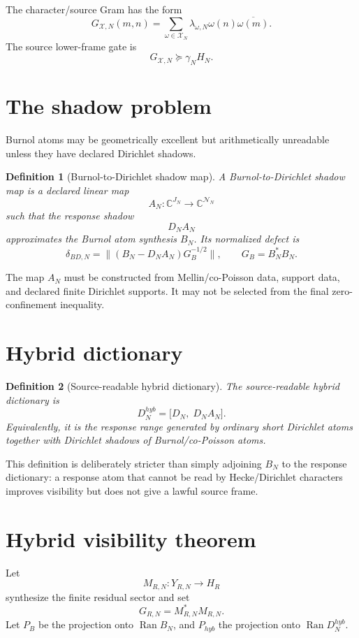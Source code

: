 \documentclass[11pt]{article}
\newtheorem{definition}{Definition}
\begin{document}
The character/source Gram has the form
\[
G_{\mathcal X,N}(m,n)
=
\sum_{\omega\in\mathcal X_N}
\lambda_{\omega,N}\omega(n)\overline{\omega(m)}.
\]
The source lower-frame gate is
\[
G_{\mathcal X,N}\succeq\gamma_NH_N.
\]

\section{The shadow problem}

Burnol atoms may be geometrically excellent but arithmetically unreadable unless they have
declared Dirichlet shadows.

\begin{definition}[Burnol-to-Dirichlet shadow map]
A Burnol-to-Dirichlet shadow map is a declared linear map
\[
A_N:\mathbb C^{J_N}\to\mathbb C^{\mathcal N_N}
\]
such that the response shadow
\[
D_NA_N
\]
approximates the Burnol atom synthesis \(B_N\).  Its normalized defect is
\[
\delta_{BD,N}
=
\|(B_N-D_NA_N)G_B^{-1/2}\|,
\qquad
G_B=B_N^*B_N.
\]
\end{definition}

The map \(A_N\) must be constructed from Mellin/co-Poisson data, support data, and declared
finite Dirichlet supports.  It may not be selected from the final zero-confinement inequality.

\section{Hybrid dictionary}

\begin{definition}[Source-readable hybrid dictionary]
The source-readable hybrid dictionary is
\[
D_N^{hyb}
=
\bigl[D_N,\;D_NA_N\bigr].
\]
Equivalently, it is the response range generated by ordinary short Dirichlet atoms together with
Dirichlet shadows of Burnol/co-Poisson atoms.
\end{definition}

This definition is deliberately stricter than simply adjoining \(B_N\) to the response dictionary:
a response atom that cannot be read by Hecke/Dirichlet characters improves visibility but does
not give a lawful source frame.

\section{Hybrid visibility theorem}

Let
\[
M_{R,N}:Y_{R,N}\to H_R
\]
synthesize the finite residual sector and set
\[
G_{R,N}=M_{R,N}^*M_{R,N}.
\]
Let \(P_B\) be the projection onto \(\operatorname{Ran}B_N\), and \(P_{hyb}\) the projection onto
\(\operatorname{Ran}D_N^{hyb}\).
\end{document}
